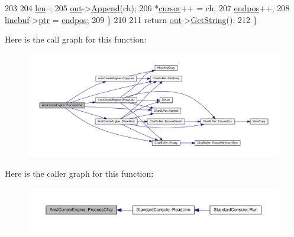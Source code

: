 \begin{DoxyCode}
203 
204         \hyperlink{classAnsiConoleEngine_ad5d65280df848947f5b2dda80dcf35c6}{len}--;
205         \hyperlink{classAnsiConoleEngine_ad6a604fc0a0f544907513076c72434f3}{out}->\hyperlink{classCharBuffer_a045b38735f7b3007c1b98d3d7b7feafe}{Append}(ch);
206         *\hyperlink{classAnsiConoleEngine_aea3df1b13bc8ecf2eb68ec693249800f}{cursor}++ = ch;
207         \hyperlink{classAnsiConoleEngine_a28852245082570631c7392411fec89cc}{endpos}++;
208         \hyperlink{classAnsiConoleEngine_a6bf88afa72a458e3687972f9e666cd86}{linebuf}->\hyperlink{classCharBuffer_a2d313433650506fd6609e6947729dfb0}{ptr} = \hyperlink{classAnsiConoleEngine_a28852245082570631c7392411fec89cc}{endpos};
209     \}
210 
211     \textcolor{keywordflow}{return} \hyperlink{classAnsiConoleEngine_ad6a604fc0a0f544907513076c72434f3}{out}->\hyperlink{classCharBuffer_a7dfd3feaaf80f318ba44efe15b1ec44b}{GetString}();
212 \}
\end{DoxyCode}


Here is the call graph for this function\+:
\nopagebreak
\begin{figure}[H]
\begin{center}
\leavevmode
\includegraphics[width=350pt]{df/d87/classAnsiConoleEngine_a7bb2dea88ddc5ae76643d2303fcc4bf1_cgraph}
\end{center}
\end{figure}




Here is the caller graph for this function\+:
\nopagebreak
\begin{figure}[H]
\begin{center}
\leavevmode
\includegraphics[width=350pt]{df/d87/classAnsiConoleEngine_a7bb2dea88ddc5ae76643d2303fcc4bf1_icgraph}
\end{center}
\end{figure}


